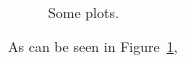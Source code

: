\documentclass[a4paper]{scrartcl}
\begin{document}
\begin{figure}[t]
    \centering
    
    
    \caption{Some plots.}
    \label{fig:some_plots}
\end{figure}

As can be seen in Figure~\ref{fig:some_plots}, \lipsum[1-2]
\end{document}
